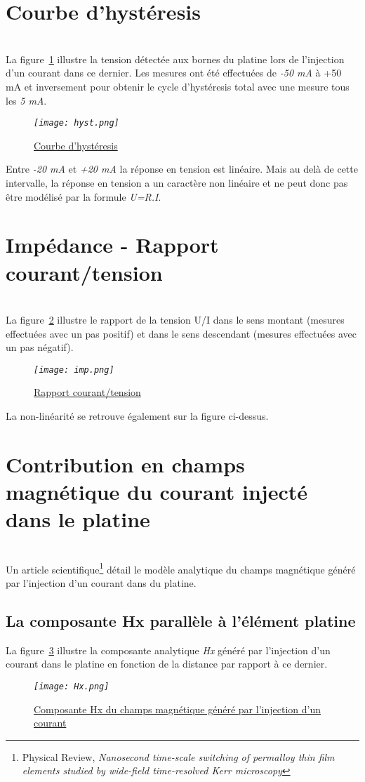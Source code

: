\documentclass[12pt,fleqn]{book} %
\begin{document}
\section{Courbe d'hystéresis}
~\\\noindent La figure~\underline{\color{blue}\ref{hyst}} illustre la tension détectée aux bornes du platine lors de l'injection d'un courant dans ce dernier. Les mesures ont été effectuées de \emph{-50 mA} à {+50 mA} et inversement pour obtenir le cycle d'hystéresis total avec une mesure tous les \emph{5 mA}.
\begin{figure}[H]
	\centering
	\itshape
	\texttt{[image: hyst.png]}
	\caption{\label{hyst} \underline{Courbe d'hystéresis}}
\end{figure}
\noindent Entre \emph{-20 mA} et \emph{+20 mA} la réponse en tension est linéaire. Mais au delà de cette intervalle, la réponse en tension a un caractère non linéaire et ne peut donc pas être modélisé par la formule \emph{U=R.I}.
\section{Impédance - Rapport courant/tension}
~\\\noindent La figure~\underline{\color{blue}\ref{imp}} illustre le rapport de la tension U/I dans le sens montant (mesures effectuées avec un pas positif) et dans le sens descendant (mesures effectuées avec un pas négatif).
\begin{figure}[H]
	\centering
	\itshape
	\texttt{[image: imp.png]}
	\caption{\label{imp} \underline{Rapport courant/tension}}
\end{figure}
La non-linéarité se retrouve également sur la figure ci-dessus.
\section{Contribution en champs magnétique du courant injecté dans le platine}
~\\\noindent Un article scientifique\footnote{Physical Review, \emph{Nanosecond time-scale switching of permalloy thin film elements studied by wide-field time-resolved Kerr microscopy}} détail le modèle analytique du champs magnétique généré par l'injection d'un courant dans du platine.
\subsection{La composante Hx parallèle à l'élément platine}
\noindent La figure~\underline{\color{blue}\ref{hx}} illustre la composante analytique \emph{Hx} généré par l'injection d'un courant dans le platine en fonction de la distance par rapport à ce dernier.
\begin{figure}[H]
	\centering
	\itshape
	\texttt{[image: Hx.png]}
	\caption{\label{hx} \underline{Composante Hx du champs magnétique généré par l'injection d'un courant}}
\end{figure}
\end{document}
